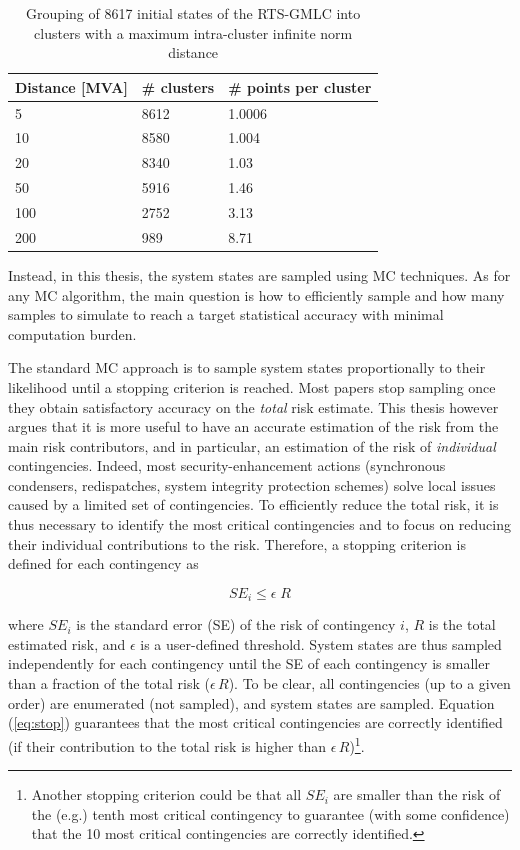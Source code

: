 \begin{table}
\centering
\caption{Grouping of 8617 initial states of the RTS-GMLC into clusters with a maximum intra-cluster infinite norm distance}
\label{tab:clustering}
\begin{tabular}{@{}lll@{}}
\toprule
Distance [MVA] & \# clusters & \# points per cluster \\ \midrule
5             & 8612        & 1.0006    \\
10            & 8580        & 1.004     \\
20            & 8340        & 1.03      \\
50            & 5916        & 1.46      \\
100           & 2752        & 3.13      \\
200           & 989         & 8.71      \\ \bottomrule
\end{tabular}
\end{table}

Instead, in this thesis, the system states are sampled using MC techniques. As for any MC algorithm, the main question is how to efficiently sample and how many samples to simulate to reach a target statistical accuracy with minimal computation burden.

The standard MC approach is to sample system states proportionally to their likelihood until a stopping criterion is reached. Most papers stop sampling once they obtain satisfactory accuracy on the \emph{total} risk estimate. This thesis however argues that it is more useful to have an accurate estimation of the risk from the main risk contributors, and in particular, an estimation of the risk of \emph{individual} contingencies. Indeed, most security-enhancement actions (synchronous condensers, redispatches, system integrity protection schemes) solve local issues caused by a limited set of contingencies. To efficiently reduce the total risk, it is thus necessary to identify the most critical contingencies and to focus on reducing their individual contributions to the risk. Therefore, a stopping criterion is defined for each contingency as

\begin{equation}
  \label{eq:stop}
  SE_i \leq \epsilon \; R
\end{equation}

\noindent where \(SE_i\) is the standard error (SE) of the risk of contingency \(i\), \(R\) is the total estimated risk, and \(\epsilon\) is a user-defined threshold. System states are thus sampled independently for each contingency until the SE of each contingency is smaller than a fraction of the total risk (\(\epsilon \, R\)). To be clear, all contingencies (up to a given order) are enumerated (not sampled), and system states are sampled. Equation (\ref{eq:stop}) guarantees that the most critical contingencies are correctly identified (if their contribution to the total risk is higher than \(\epsilon \, R\))\footnote{Another stopping criterion could be that all \(SE_i\) are smaller than the risk of the (e.g.) tenth most critical contingency to guarantee (with some confidence) that the 10 most critical contingencies are correctly identified.}.

